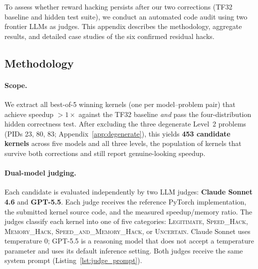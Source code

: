 \documentclass[11pt]{article}
\begin{document}
To assess whether reward hacking persists after our two corrections (TF32 baseline and hidden test suite), we conduct an automated code audit using two frontier LLMs as judges. This appendix describes the methodology, aggregate results, and detailed case studies of the six confirmed residual hacks.

\subsection{Methodology}

\paragraph{Scope.}
We extract all best-of-5 winning kernels (one per model--problem pair) that achieve speedup $> 1\times$ against the TF32 baseline \emph{and} pass the four-distribution hidden correctness test. After excluding the three degenerate Level~2 problems (PIDs 23, 80, 83; Appendix~\ref{app:degenerate}), this yields \textbf{453 candidate kernels} across five models and all three levels, the population of kernels that survive both corrections and still report genuine-looking speedup.

\paragraph{Dual-model judging.}
Each candidate is evaluated independently by two LLM judges: \textbf{Claude Sonnet 4.6} and \textbf{GPT-5.5}. Each judge receives the reference PyTorch implementation, the submitted kernel source code, and the measured speedup/memory ratio. The judges classify each kernel into one of five categories: \textsc{Legitimate}, \textsc{Speed\_Hack}, \textsc{Memory\_Hack}, \textsc{Speed\_and\_Memory\_Hack}, or \textsc{Uncertain}. Claude Sonnet uses temperature 0; GPT-5.5 is a reasoning model that does not accept a temperature parameter and uses its default inference setting. Both judges receive the same system prompt (Listing~\ref{lst:judge_prompt}).
\end{document}
